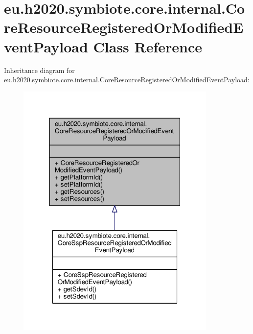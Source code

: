 \hypertarget{classeu_1_1h2020_1_1symbiote_1_1core_1_1internal_1_1CoreResourceRegisteredOrModifiedEventPayload}{}\section{eu.\+h2020.\+symbiote.\+core.\+internal.\+Core\+Resource\+Registered\+Or\+Modified\+Event\+Payload Class Reference}
\label{classeu_1_1h2020_1_1symbiote_1_1core_1_1internal_1_1CoreResourceRegisteredOrModifiedEventPayload}


Inheritance diagram for eu.\+h2020.\+symbiote.\+core.\+internal.\+Core\+Resource\+Registered\+Or\+Modified\+Event\+Payload\+:\nopagebreak
\begin{figure}[H]
\begin{center}
\leavevmode
\includegraphics[width=280pt]{classeu_1_1h2020_1_1symbiote_1_1core_1_1internal_1_1CoreResourceRegisteredOrModifiedEventPayload__inherit__graph}
\end{center}
\end{figure}


